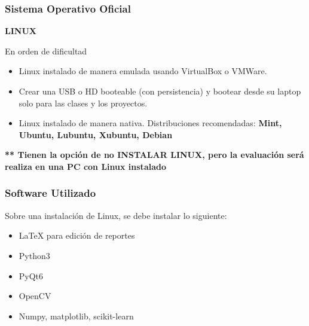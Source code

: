 \begin{frame}
\frametitle{Sistema Operativo Oficial}

\textbf{LINUX}
\begin{block}{En orden de dificultad}
\begin{itemize}
\item Linux instalado de manera emulada usando VirtualBox o VMWare.
\item Crear una USB o HD booteable (con persistencia) y bootear desde su laptop solo para las clases y los proyectos.
\item Linux instalado de manera nativa. Distribuciones recomendadas: \textbf{Mint, Ubuntu, Lubuntu, Xubuntu, Debian}
\end{itemize}
\end{block}
\textbf{** Tienen la opción de no INSTALAR LINUX, pero la evaluación será realiza en una PC con Linux instalado}
\end{frame}


\begin{frame}
\frametitle{Software Utilizado}
Sobre una instalación de Linux, se debe instalar lo siguiente:
\begin{itemize}
\item LaTeX para edición de reportes
\item Python3
\item PyQt6
\item OpenCV
\item Numpy, matplotlib, scikit-learn
\end{itemize}
\end{frame}

